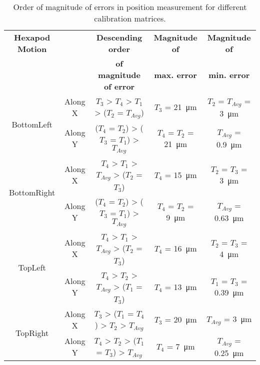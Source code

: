     \begin{table}[ht]
        \centering
        \footnotesize
        \begin{tabular}{ccccc}
                \toprule
                \textbf{Hexapod Motion} & & \textbf{Descending order} & \textbf{Magnitude of} & \textbf{Magnitude of} \\
                & & \textbf{of magnitude of error} & \textbf{max. error} & \textbf{min. error} \\
                \midrule
                
                \multirow{2}{*}{\textsf{BottomLeft}} & Along X & $T_3$ > $T_4$ > $T_1$ > ($T_2$ = $T_{Avg}$) & $T_3$ = \SI{21}{\micro\meter} & $T_2$ = $T_{Avg}$  = \SI{3}{\micro\meter} \\
                & Along Y & ($T_4$ = $T_2$) > ($T_3$ = $T_1$) > $T_{Avg}$ & $T_4$ = $T_2$ = \SI{21}{\micro\meter} & $T_{Avg}$ = \SI{0.9}{\micro\meter} \\
                
                \midrule
                
                \multirow{2}{*}{\textsf{BottomRight}} & Along X & $T_4$ > $T_1$ > $T_{Avg}$ > ($T_2$ = $T_3$) & $T_4$ = \SI{15}{\micro\meter} & $T_2$ = $T_3$  = \SI{3}{\micro\meter} \\
                & Along Y & ($T_4$ = $T_2$) > ($T_3$ = $T_1$) > $T_{Avg}$ & $T_4$ = $T_2$ = \SI{9}{\micro\meter} & $T_{Avg}$ = \SI{0.63}{\micro\meter} \\

                \midrule

                \multirow{2}{*}{\textsf{TopLeft}} & Along X & $T_4$ > $T_1$ > $T_{Avg}$ > ($T_2$ = $T_3$) & $T_4$ = \SI{16}{\micro\meter} & $T_2$ = $T_3$  = \SI{4}{\micro\meter} \\
                & Along Y & $T_4$ > $T_2$ > $T_{Avg}$ > ($T_1$ = $T_3$) & $T_4$ = \SI{13}{\micro\meter} & $T_1$ = $T_3$ = \SI{0.39}{\micro\meter} \\

                \midrule

                \multirow{2}{*}{\textsf{TopRight}} & Along X & $T_3$ > ($T_1$ = $T_4$) > $T_2$ > $T_{Avg}$ & $T_3$ = \SI{20}{\micro\meter} & $T_{Avg}$ = \SI{3}{\micro\meter} \\
                & Along Y & $T_4$ > $T_2$ > ($T_1$ = $T_3$) > $T_{Avg}$ & $T_4$ = \SI{7}{\micro\meter} & $T_{Avg}$ = \SI{0.25}{\micro\meter} \\
                
                \bottomrule
        \end{tabular}
        \caption{Order of magnitude of errors in position measurement for different calibration matrices.}
        \label{table:oom_calib_matrices}
    \end{table}

